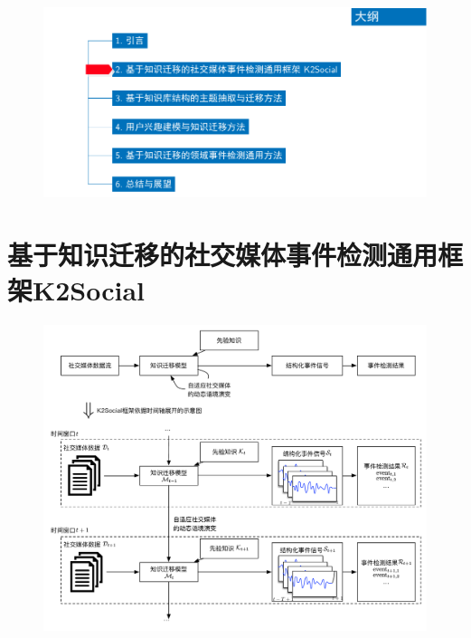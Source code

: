 \begin{withoutheadline}
\begin{frame}
\vspace*{-13mm}
\begin{figure}
	\hspace*{-4.2mm}
    \includegraphics[width=1.0\paperwidth]{img/contents2_output.pdf}
\end{figure}

\end{frame}
\end{withoutheadline}

\section{基于知识迁移的社交媒体事件检测通用框架K2Social}
\begin{frame}
\vspace*{-2mm}
\begin{figure}
    \includegraphics[width=0.66\paperwidth]{img/K2Social_flow}
\end{figure}

\end{frame}

